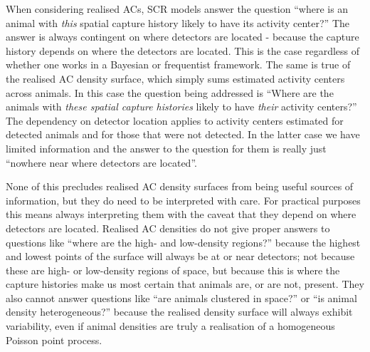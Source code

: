 \documentclass[useAMS,usenatbib,referee]{biom}
\begin{document}

When considering realised ACs, SCR models answer the question ``where is an animal with {\it this} spatial capture history likely to have its activity center?'' The answer is always contingent on where detectors are located - because the capture history depends on where the detectors are located. %
This is the case regardless of whether one works in a Bayesian or frequentist framework. The same is true of the realised AC density surface, which simply sums estimated activity centers across animals. In this case the question being addressed is ``Where are the animals with {\it these spatial capture histories} likely to have {\it their} activity centers?'' The dependency on detector location applies to activity centers estimated for detected animals and for those that were not detected. In the latter case we have limited information and the answer to the question for them is really just ``nowhere near where detectors are located''. 

None of this precludes realised AC density surfaces from being useful sources of information, but they do need to be interpreted with care. For practical purposes this means always interpreting them with the caveat that they depend on where detectors are located. Realised AC densities do not give proper answers to questions like ``where are the high- and low-density regions?'' because the highest and lowest points of the surface will always be at or near detectors; not because these are high- or low-density regions of space, but because this is where the capture histories make us most certain that animals are, or are not, present. They also cannot answer questions like ``are animals clustered in space?'' or ``is animal density heterogeneous?'' because the realised density surface will always exhibit variability, even if animal densities are truly a realisation of a homogeneous Poisson point process.
\end{document}
